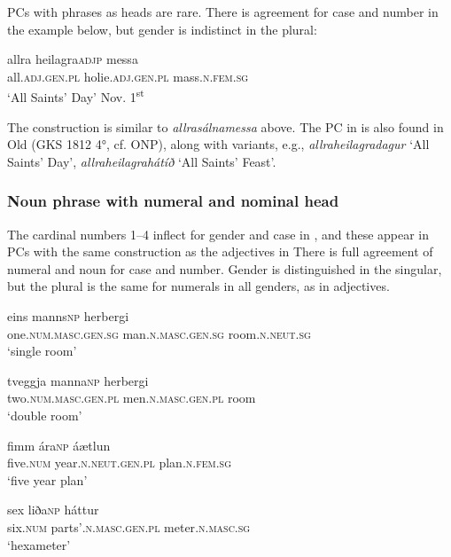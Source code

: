 \documentclass[output=paper]{LSP/langsci}
\begin{document}
\begin{xlist}
PCs with  phrases as heads are rare. There is agreement for case and number in the example below, but gender is indistinct in the  plural:

\ea%
 \label{ex:bjarnadottir:16} {}
\gll  {\ob}allra heilagra{\cb}\textsc{adjp} messa\\
 all\textsc{.adj.gen.pl} holie\textsc{.adj.gen.pl} mass\textsc{.n.fem.sg}\\
\glt ‘All Saints’ Day’ Nov. 1\textsuperscript{st}
\z

The construction is similar to \textit{allrasálnamessa}  above. The PC in  is also found in Old  (GKS 1812 4°, cf. ONP), along with variants, e.g., \textit{allra\-heilagra\-dagur} ‘All Saints' Day’, \textit{allraheilagrahátíð} ‘All Saints' Feast’.

\subsubsection{Noun phrase with numeral  and nominal head}\label{sec:bjarnadottir:3.1.3}

The cardinal numbers 1–4 inflect for gender and case in , and these appear in PCs with the same construction as the adjectives in  There is full agreement of numeral and noun for case and number. Gender is distinguished in the singular, but the  plural is the same for numerals in all genders, as in adjectives. 

\ea%
 \label{ex:bjarnadottir:17} 
\ea
\gll  {\ob}eins manns{\cb}\textsc{np} herbergi\\
 one\textsc{.num.masc.gen.sg} man\textsc{.n.masc.gen.sg} room\textsc{.n.neut.sg}\\
\glt ‘single room’

\ex
\gll {\ob}tveggja manna{\cb}\textsc{np} herbergi\\
 two\textsc{.num.masc.gen.pl} men\textsc{.n.masc.gen.pl} room  \\
\glt ‘double room’

\ex
\gll {\ob}fimm ára{\cb}\textsc{np} áætlun\\
 five\textsc{.num} year\textsc{.n.neut.gen.pl} plan\textsc{.n.fem.sg}\\
\glt ‘five year plan’

\ex
\gll {\ob}sex liða{\cb}\textsc{np} háttur\\
 six\textsc{.num} parts’\textsc{.n.masc.gen.pl} meter\textsc{.n.masc.sg}\\
\glt ‘hexameter’ 
\z
\z


\end{xlist}
\end{document}
